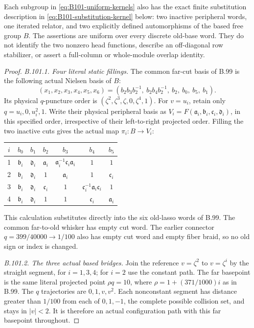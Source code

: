 Each subgroup in \eqref{eq:B101-uniform-kernels} also has the exact
finite substitution description in \eqref{eq:B101-substitution-kernel}
below: two inactive peripheral words, one iterated relator, and two
explicitly defined automorphisms of the based free group $B$.
The assertions are uniform over every discrete old-base word.
They do not identify the two nonzero head functions, describe an
off-diagonal row stabilizer, or assert a full-column or whole-module
overlap identity.

\begin{proof}
\emph{B.101.1. Four literal static fillings.}
The common far-cut basis of B.99 is the following actual Nielsen basis
of $B$:
\begin{equation}\label{eq:B101-six-cut-basis}
 (x_1,x_2,x_3,x_4,x_5,x_6)
 =(b_2b_3b_2^{-1},\ b_2b_4b_2^{-1},\ b_2,\ b_0,\ b_5,\ b_1).
\end{equation}
Its physical $q$-puncture order is
$(\zeta^2,\zeta^3,\zeta,0,\zeta^4,1)$.
For $v=u_i$, retain only $q=u_i,0,u_i^2,1$.
Write their physical peripheral basis as
$V_i=F(\mathfrak{a}_i,\mathfrak{b}_i,\mathfrak{c}_i,\mathfrak{d}_i)$, in this specified order, irrespective of
their left-to-right projected order.
Filling the two inactive cuts gives the actual map $\pi_i:B\to V_i$:
\begin{center}
\small
\begin{tabular}{c@{\qquad}cccccc}
\toprule
$i$&$b_0$&$b_1$&$b_2$&$b_3$&$b_4$&$b_5$\\
\midrule
1&$\mathfrak{b}_i$&$\mathfrak{d}_i$&$\mathfrak{a}_i$&$\mathfrak{a}_i^{-1}\mathfrak{c}_i \mathfrak{a}_i$&$1$&$1$\\
2&$\mathfrak{b}_i$&$\mathfrak{d}_i$&$1$&$\mathfrak{a}_i$&$1$&$\mathfrak{c}_i$\\
3&$\mathfrak{b}_i$&$\mathfrak{d}_i$&$\mathfrak{c}_i$&$1$&$\mathfrak{c}_i^{-1}\mathfrak{a}_i \mathfrak{c}_i$&$1$\\
4&$\mathfrak{b}_i$&$\mathfrak{d}_i$&$1$&$1$&$\mathfrak{c}_i$&$\mathfrak{a}_i$\\
\bottomrule
\end{tabular}
\end{center}
This calculation substitutes directly into the six old-lasso words
of B.99.  The common far-to-old whisker has empty cut word.
The earlier connector $q=399/40000\to1/100$ also has empty cut word
and empty fiber braid, so no old sign or index is changed.

\emph{B.101.2. The three actual based bridges.}
Join the reference $v=\zeta^2$ to $v=\zeta^i$ by the straight segment,
for $i=1,3,4$; for $i=2$ use the constant path.
The far basepoint is the same literal projected point $\rho q=10$,
where $\rho=1+(371/1000)i$ as in B.99.
The $q$ trajectories are $0,1,v,v^2$.
Each nonconstant segment has distance greater than $1/100$ from
each of $0,1,-1$, the complete possible collision set, and stays in
$|v|<2$.  It is therefore an actual configuration path with this far
basepoint throughout.


\end{proof}
